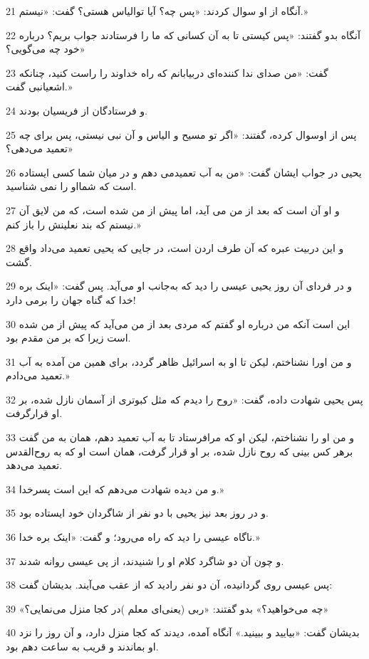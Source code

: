 \par 21 آنگاه از او سوال کردند: «پس چه؟ آیا توالیاس هستی؟ گفت: «نیستم.»
\par 22 آنگاه بدو گفتند: «پس کیستی تا به آن کسانی که ما را فرستادند جواب بریم؟ درباره خود چه می‌گویی؟»
\par 23 گفت: «من صدای ندا کننده‌ای دربیابانم که راه خداوند را راست کنید، چنانکه اشعیانبی گفت.»
\par 24 و فرستادگان از فریسیان بودند.
\par 25 پس از اوسوال کرده، گفتند: «اگر تو مسیح و الیاس و آن نبی نیستی، پس برای چه تعمید می‌دهی؟»
\par 26 یحیی در جواب ایشان گفت: «من به آب تعمیدمی دهم و در میان شما کسی ایستاده است که شمااو را نمی شناسید.
\par 27 و او آن است که بعد از من می آید، اما پیش از من شده است، که من لایق آن نیستم که بند نعلینش را باز کنم.»
\par 28 و این دربیت عبره که آن طرف اردن است، در جایی که یحیی تعمید می‌داد واقع گشت.
\par 29 و در فردای آن روز یحیی عیسی را دید که به‌جانب او می‌آید. پس گفت: «اینک بره خدا که گناه جهان را برمی دارد!
\par 30 این است آنکه من درباره او گفتم که مردی بعد از من می‌آید که پیش از من شده است زیرا که بر من مقدم بود.
\par 31 و من اورا نشناختم، لیکن تا او به اسرائیل ظاهر گردد، برای همین من آمده به آب تعمید می‌دادم.»
\par 32 پس یحیی شهادت داده، گفت: «روح را دیدم که مثل کبوتری از آسمان نازل شده، بر او قرارگرفت.
\par 33 و من او را نشناختم، لیکن او که مرافرستاد تا به آب تعمید دهم، همان به من گفت برهر کس بینی که روح نازل شده، بر او قرار گرفت، همان است او که به روح‌القدس تعمید می‌دهد.
\par 34 و من دیده شهادت می‌دهم که این است پسرخدا.»
\par 35 و در روز بعد نیز یحیی با دو نفر از شاگردان خود ایستاده بود.
\par 36 ناگاه عیسی را دید که راه می‌رود؛ و گفت: «اینک بره خدا.»
\par 37 و چون آن دو شاگرد کلام او را شنیدند، از پی عیسی روانه شدند.
\par 38 پس عیسی روی گردانیده، آن دو نفر رادید که از عقب می‌آیند. بدیشان گفت:
\par 39 «چه می‌خواهید؟» بدو گفتند: «ربی (یعنی‌ای معلم )در کجا منزل می‌نمایی؟»
\par 40 بدیشان گفت: «بیایید و ببینید.» آنگاه آمده، دیدند که کجا منزل دارد، و آن روز را نزد او بماندند و قریب به ساعت دهم بود.
